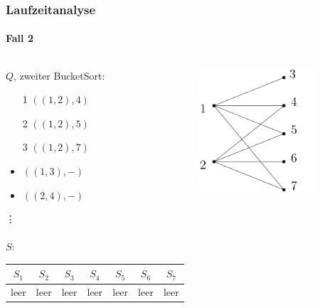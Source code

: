 \begin{frame}[t]
\frametitle{Laufzeitanalyse}
\framesubtitle{Fall 2}


\begin{columns}
	\begin{block}{$Q$, zweiter BucketSort:}
		\begin{itemize}
			\item[1] $((1,2), 4)$
			\item[2] $((1,2), 5)$
			\item[3] $((1,2), 7)$
			\item $((1,3), -)$
			\item $((2,4), -)$
		\end{itemize}
		\vdots
		\ \\
		\ \\
		$S$: \\
		\begin{tabular}{| c | c | c | c | c | c | c |}
			\hline
			$S_1$ & $S_2$ & $S_3$ & $S_4$ & $S_5$ & $S_6$ & $S_7$ \\
			\hline
			{\scriptsize leer} & {\scriptsize leer} & {\scriptsize leer} & {\scriptsize leer} & {\scriptsize leer} & {\scriptsize leer} & {\scriptsize leer} \\
			\hline
		\end{tabular}
	\end{block}
	
	\includegraphics[width=0.7\textwidth]{images/Graph_Queue_1.png}
\end{columns}
\end{frame}


